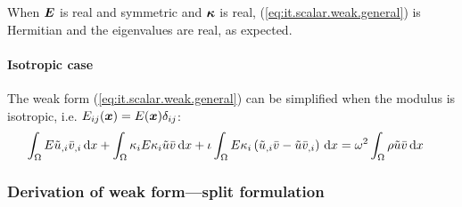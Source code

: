 %
When $\boldsymbol{E}$ is real and symmetric and $\boldsymbol{\kappa}$ is real, (\ref{eq:it.scalar.weak.general}) is Hermitian and the eigenvalues are real, as expected.


\paragraph{Isotropic case} The weak form (\ref{eq:it.scalar.weak.general}) can be simplified when the modulus is isotropic, i.e. \(E_{ij}(\boldsymbol{x}) = E(\boldsymbol{x}) \delta_{ij}\):
%
\begin{align}
    \int_{\Omega} {
        E \tilde{u}_{,i} \bar{v}_{,i} \,\mathrm{d}x
    } + \int_{\Omega} {
        \kappa_{i} E \kappa_{i} \tilde{u} \bar{v} \,\mathrm{d}x
    } + \iota \int_{\Omega} {
        E \kappa_{i} \left(
            \tilde{u}_{,i} \bar{v} - \tilde{u} \bar{v}_{,i}
        \right) \,\mathrm{d}x
    } &=
    \omega^2 \int_{\Omega} { \rho \tilde{u} \bar{v} \,\mathrm{d}x }
    \label{eq:it.scalar.weak.iso}
\end{align}


\subsubsection{Derivation of weak form---split formulation}
\label{sec:it.scalar.weak-split-derivation}

